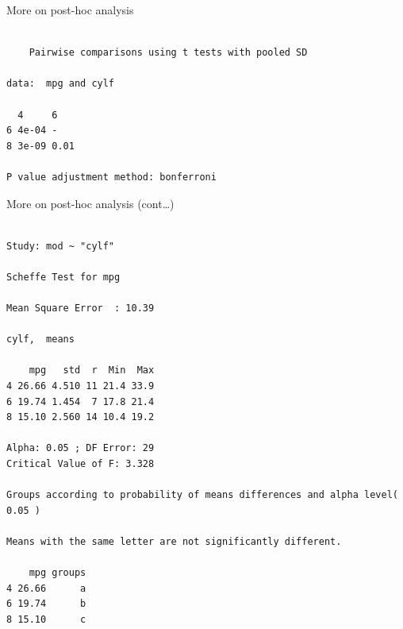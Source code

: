\begin{frame}[fragile]{More on post-hoc analysis}

\begin{Shaded}
\begin{Highlighting}[]
 \NormalTok{)}
\NormalTok{)}
\end{Highlighting}
\end{Shaded}

\begin{verbatim}

    Pairwise comparisons using t tests with pooled SD 

data:  mpg and cylf 

  4     6   
6 4e-04 -   
8 3e-09 0.01

P value adjustment method: bonferroni 
\end{verbatim}

\end{frame}

\begin{frame}[fragile]{More on post-hoc analysis (cont\ldots{})}

\begin{Shaded}
\begin{Highlighting}[]
\NormalTok{, }\NormalTok{)}
\end{Highlighting}
\end{Shaded}

\begin{verbatim}

Study: mod ~ "cylf"

Scheffe Test for mpg 

Mean Square Error  : 10.39 

cylf,  means

    mpg   std  r  Min  Max
4 26.66 4.510 11 21.4 33.9
6 19.74 1.454  7 17.8 21.4
8 15.10 2.560 14 10.4 19.2

Alpha: 0.05 ; DF Error: 29 
Critical Value of F: 3.328 

Groups according to probability of means differences and alpha level( 0.05 )

Means with the same letter are not significantly different.

    mpg groups
4 26.66      a
6 19.74      b
8 15.10      c
\end{verbatim}

\end{frame}

